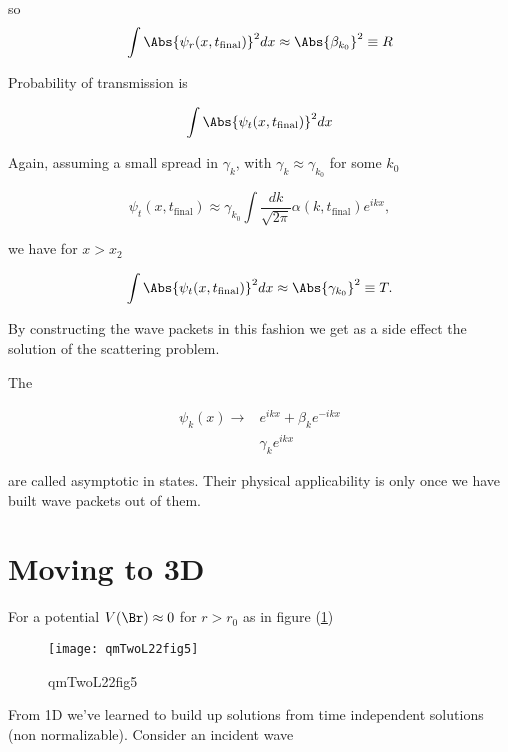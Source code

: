 so
\begin{equation}\label{eqn:qmTwoL22:430}
\int \Abs{\psi_r(x, t_{\text{final}})}^2 dx
\approx \Abs{\beta_{k_0}}^2 \equiv R
\end{equation}

Probability of transmission is

\begin{equation}\label{eqn:qmTwoL22:450}
\int \Abs{\psi_t(x, t_{\text{final}})}^2 dx
\end{equation}

Again, assuming a small spread in $\gamma_k$, with $\gamma_k \approx \gamma_{k_0}$ for some $k_0$

\begin{equation}\label{eqn:qmTwoL22:470}
\psi_t(x, t_{\text{final}}) \approx \gamma_{k_0}
\int \frac{dk}{\sqrt{2 \pi}} \alpha(k, t_{\text{final}}) e^{i k x},
\end{equation}

we have for $x > x_2$

\begin{equation}\label{eqn:qmTwoL22:490}
\int \Abs{\psi_t(x, t_{\text{final}})}^2 dx
\approx \Abs{\gamma_{k_0}}^2 \equiv T.
\end{equation}

By constructing the wave packets in this fashion we get as a side effect the solution of the scattering problem.

The

\begin{align*}
\psi_k(x) \rightarrow & e^{i k x} + \beta_k e^{-i k x} \\
& \gamma_k e^{i k x}
\end{align*}

are called asymptotic in states.  Their physical applicability is only once we have built wave packets out of them.

\section{Moving to 3D}

For a potential $V(\Br) \approx 0$ for $r > r_0$ as in figure (\ref{fig:qmTwoL22:qmTwoL22fig5})

\begin{figure}[htp]
   \centering
   \texttt{[image: qmTwoL22fig5]}
   \caption{qmTwoL22fig5}\label{fig:qmTwoL22:qmTwoL22fig5}
\end{figure}

From 1D we've learned to build up solutions from time independent solutions (non normalizable).  Consider an incident wave

